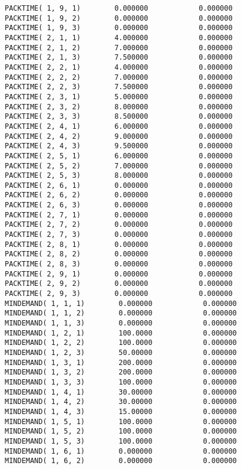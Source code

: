 \documentclass[12pt]{article}
\begin{document}
\begin{appendices}
\begin{lstlisting}
PACKTIME( 1, 9, 1)        0.000000            0.000000
PACKTIME( 1, 9, 2)        0.000000            0.000000
PACKTIME( 1, 9, 3)        0.000000            0.000000
PACKTIME( 2, 1, 1)        4.000000            0.000000
PACKTIME( 2, 1, 2)        7.000000            0.000000
PACKTIME( 2, 1, 3)        7.500000            0.000000
PACKTIME( 2, 2, 1)        4.000000            0.000000
PACKTIME( 2, 2, 2)        7.000000            0.000000
PACKTIME( 2, 2, 3)        7.500000            0.000000
PACKTIME( 2, 3, 1)        5.000000            0.000000
PACKTIME( 2, 3, 2)        8.000000            0.000000
PACKTIME( 2, 3, 3)        8.500000            0.000000
PACKTIME( 2, 4, 1)        6.000000            0.000000
PACKTIME( 2, 4, 2)        9.000000            0.000000
PACKTIME( 2, 4, 3)        9.500000            0.000000
PACKTIME( 2, 5, 1)        6.000000            0.000000
PACKTIME( 2, 5, 2)        7.000000            0.000000
PACKTIME( 2, 5, 3)        8.000000            0.000000
PACKTIME( 2, 6, 1)        0.000000            0.000000
PACKTIME( 2, 6, 2)        0.000000            0.000000
PACKTIME( 2, 6, 3)        0.000000            0.000000
PACKTIME( 2, 7, 1)        0.000000            0.000000
PACKTIME( 2, 7, 2)        0.000000            0.000000
PACKTIME( 2, 7, 3)        0.000000            0.000000
PACKTIME( 2, 8, 1)        0.000000            0.000000
PACKTIME( 2, 8, 2)        0.000000            0.000000
PACKTIME( 2, 8, 3)        0.000000            0.000000
PACKTIME( 2, 9, 1)        0.000000            0.000000
PACKTIME( 2, 9, 2)        0.000000            0.000000
PACKTIME( 2, 9, 3)        0.000000            0.000000
MINDEMAND( 1, 1, 1)        0.000000            0.000000
MINDEMAND( 1, 1, 2)        0.000000            0.000000
MINDEMAND( 1, 1, 3)        0.000000            0.000000
MINDEMAND( 1, 2, 1)        100.0000            0.000000
MINDEMAND( 1, 2, 2)        100.0000            0.000000
MINDEMAND( 1, 2, 3)        50.00000            0.000000
MINDEMAND( 1, 3, 1)        200.0000            0.000000
MINDEMAND( 1, 3, 2)        200.0000            0.000000
MINDEMAND( 1, 3, 3)        100.0000            0.000000
MINDEMAND( 1, 4, 1)        30.00000            0.000000
MINDEMAND( 1, 4, 2)        30.00000            0.000000
MINDEMAND( 1, 4, 3)        15.00000            0.000000
MINDEMAND( 1, 5, 1)        100.0000            0.000000
MINDEMAND( 1, 5, 2)        100.0000            0.000000
MINDEMAND( 1, 5, 3)        100.0000            0.000000
MINDEMAND( 1, 6, 1)        0.000000            0.000000
MINDEMAND( 1, 6, 2)        0.000000            0.000000

\end{lstlisting}
\end{appendices}
\end{document}
